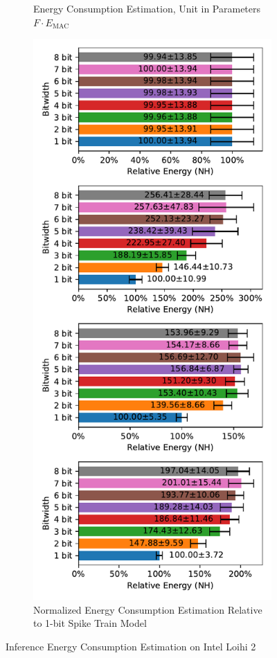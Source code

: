 \begin{figure}[H]
\begin{subfigure}[H]{0.495\textwidth}
                \caption{Energy Consumption Estimation, Unit in Parameters $F\cdot E_{\text{MAC}}$}
            \end{subfigure}
            \hfill
            \begin{subfigure}[H]{0.495\textwidth}
                \includegraphics[width=\textwidth]{../standard/MNIST/plots/mnist_test_relative_energy_nh.pdf}
                \caption{Normalized Energy Consumption Estimation Relative to 1-bit Spike Train Model}
            \end{subfigure}
            \caption{Inference Energy Consumption Estimation on Intel Loihi 2}
        \end{figure}

